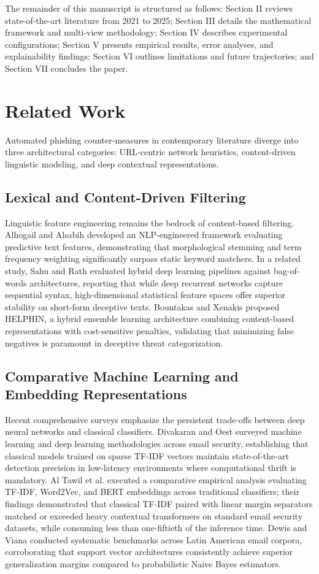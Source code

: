 \documentclass[conference]{IEEEtran}
\begin{document}
The remainder of this manuscript is structured as follows: Section II reviews state-of-the-art literature from 2021 to 2025; Section III details the mathematical framework and multi-view methodology; Section IV describes experimental configurations; Section V presents empirical results, error analyses, and explainability findings; Section VI outlines limitations and future trajectories; and Section VII concludes the paper.

\section{Related Work}
Automated phishing counter-measures in contemporary literature diverge into three architectural categories: URL-centric network heuristics, content-driven linguistic modeling, and deep contextual representations.

\subsection{Lexical and Content-Driven Filtering}
Linguistic feature engineering remains the bedrock of content-based filtering. Alhogail and Alsabih \cite{alhogail2021} developed an NLP-engineered framework evaluating predictive text features, demonstrating that morphological stemming and term frequency weighting significantly surpass static keyword matchers. In a related study, Sahu and Rath \cite{sahu2022} evaluated hybrid deep learning pipelines against bag-of-words architectures, reporting that while deep recurrent networks capture sequential syntax, high-dimensional statistical feature spaces offer superior stability on short-form deceptive texts. Bountakas and Xenakis \cite{bountakas2023} proposed HELPHIN, a hybrid ensemble learning architecture combining content-based representations with cost-sensitive penalties, validating that minimizing false negatives is paramount in deceptive threat categorization.

\subsection{Comparative Machine Learning and Embedding Representations}
Recent comprehensive surveys emphasize the persistent trade-offs between deep neural networks and classical classifiers. Divakaran and Oest \cite{divakaran2022} surveyed machine learning and deep learning methodologies across email security, establishing that classical models trained on sparse TF-IDF vectors maintain state-of-the-art detection precision in low-latency environments where computational thrift is mandatory. Al Tawil et al. \cite{altawil2024} executed a comparative empirical analysis evaluating TF-IDF, Word2Vec, and BERT embeddings across traditional classifiers; their findings demonstrated that classical TF-IDF paired with linear margin separators matched or exceeded heavy contextual transformers on standard email security datasets, while consuming less than one-fiftieth of the inference time. Dewis and Viana \cite{dewis2022} conducted systematic benchmarks across Latin American email corpora, corroborating that support vector architectures consistently achieve superior generalization margins compared to probabilistic Naive Bayes estimators.
\end{document}
